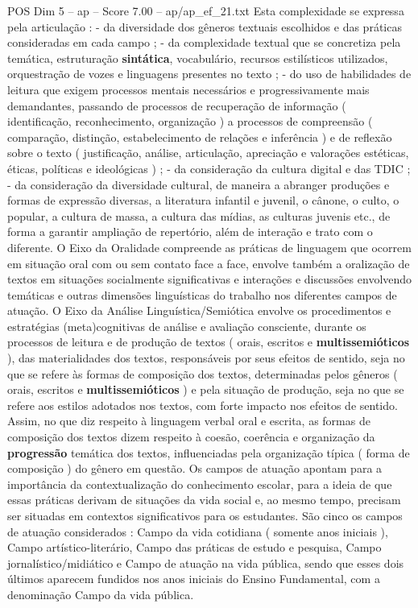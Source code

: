 \begin{textsample}{POS Dim 5 – ap – Score 7.00 – ap/ap\_ef\_21.txt}
Esta complexidade se expressa pela articulação : - da diversidade dos gêneros textuais escolhidos e das práticas consideradas em cada campo ; - da complexidade textual que se concretiza pela temática, estruturação \textbf{sintática}, vocabulário, recursos estilísticos utilizados, orquestração de vozes e linguagens presentes no texto ; - do uso de habilidades de leitura que exigem processos mentais necessários e progressivamente mais demandantes, passando de processos de recuperação de informação ( identificação, reconhecimento, organização ) a processos de compreensão ( comparação, distinção, estabelecimento de relações e inferência ) e de reflexão sobre o texto ( justificação, análise, articulação, apreciação e valorações estéticas, éticas, políticas e ideológicas ) ; - da consideração da cultura digital e das TDIC ; - da consideração da diversidade cultural, de maneira a abranger produções e formas de expressão diversas, a literatura infantil e juvenil, o cânone, o culto, o popular, a cultura de massa, a cultura das mídias, as culturas juvenis etc., de forma a garantir ampliação de repertório, além de interação e trato com o diferente.
O Eixo da Oralidade compreende as práticas de linguagem que ocorrem em situação oral com ou sem contato face a face, envolve também a oralização de textos em situações socialmente significativas e interações e discussões envolvendo temáticas e outras dimensões linguísticas do trabalho nos diferentes campos de atuação.
O Eixo da Análise Linguística/Semiótica envolve os procedimentos e estratégias (meta)cognitivas de análise e avaliação consciente, durante os processos de leitura e de produção de textos ( orais, escritos e \textbf{multissemióticos} ), das materialidades dos textos, responsáveis por seus efeitos de sentido, seja no que se refere às formas de composição dos textos, determinadas pelos gêneros ( orais, escritos e \textbf{multissemióticos} ) e pela situação de produção, seja no que se refere aos estilos adotados nos textos, com forte impacto nos efeitos de sentido.
Assim, no que diz respeito à linguagem verbal oral e escrita, as formas de composição dos textos dizem respeito à coesão, coerência e organização da \textbf{progressão} temática dos textos, influenciadas pela organização típica ( forma de composição ) do gênero em questão.
Os campos de atuação apontam para a importância da contextualização do conhecimento escolar, para a ideia de que essas práticas derivam de situações da vida social e, ao mesmo tempo, precisam ser situadas em contextos significativos para os estudantes.
São cinco os campos de atuação considerados : Campo da vida cotidiana ( somente anos iniciais ), Campo artístico-literário, Campo das práticas de estudo e pesquisa, Campo jornalístico/midiático e Campo de atuação na vida pública, sendo que esses dois últimos aparecem fundidos nos anos iniciais do Ensino Fundamental, com a denominação Campo da vida pública.

\end{textsample}
